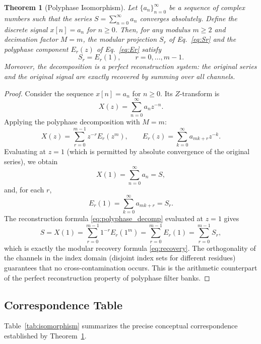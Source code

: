 \documentclass{article}
\theoremstyle{plain}
\newtheorem{theorem}{Theorem}[section]
\theoremstyle{definition}
\theoremstyle{remark}
\begin{document}
\begin{theorem}[Polyphase Isomorphism]
\label{thm:isomorphism}
Let \(\{a_n\}_{n=0}^{\infty}\) be a sequence of complex numbers such that the series \(S = \sum_{n=0}^{\infty} a_n\) converges absolutely. Define the discrete signal \(x[n] = a_n\) for \(n \ge 0\). Then, for any modulus \(m \ge 2\) and decimation factor \(M = m\), the modular projection \(S_r\) of Eq.~\eqref{eq:Sr} and the polyphase component \(E_r(z)\) of Eq.~\eqref{eq:Er} satisfy
\begin{equation}
S_r = E_r(1), \qquad r = 0, \dots, m-1.
\label{eq:equality}
\end{equation}
Moreover, the decomposition is a perfect reconstruction system: the original series and the original signal are exactly recovered by summing over all channels.
\end{theorem}

\begin{proof}
Consider the sequence \(x[n] = a_n\) for \(n \ge 0\). Its \(Z\)-transform is
\[
X(z) = \sum_{n=0}^{\infty} a_n z^{-n}.
\]
Applying the polyphase decomposition with \(M = m\):
\[
X(z) = \sum_{r=0}^{m-1} z^{-r} E_r(z^m), \qquad E_r(z) = \sum_{k=0}^{\infty} a_{mk+r} z^{-k}.
\]
Evaluating at \(z = 1\) (which is permitted by absolute convergence of the original series), we obtain
\[
X(1) = \sum_{n=0}^{\infty} a_n = S,
\]
and, for each \(r\),
\[
E_r(1) = \sum_{k=0}^{\infty} a_{mk+r} = S_r.
\]
The reconstruction formula \eqref{eq:polyphase_decomp} evaluated at \(z=1\) gives
\[
S = X(1) = \sum_{r=0}^{m-1} 1^{-r} E_r(1^m) = \sum_{r=0}^{m-1} E_r(1) = \sum_{r=0}^{m-1} S_r,
\]
which is exactly the modular recovery formula \eqref{eq:recovery}. The orthogonality of the channels in the index domain (disjoint index sets for different residues) guarantees that no cross-contamination occurs. This is the arithmetic counterpart of the perfect reconstruction property of polyphase filter banks.
\end{proof}

\subsection{Correspondence Table}
Table~\ref{tab:isomorphism} summarizes the precise conceptual correspondence established by Theorem~\ref{thm:isomorphism}.
\end{document}
